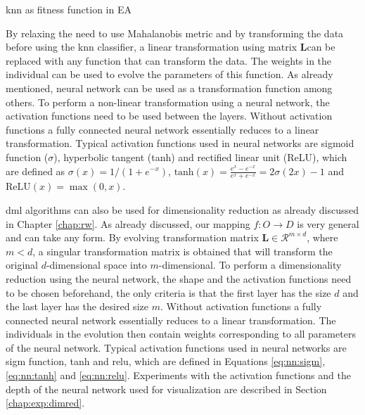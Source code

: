 \documentclass[12pt,a4paper]{report}
\begin{document}
\begin{algorithm}[t]
\caption{\ac{knn} as fitness function in EA} \label{pseudo:ea:knn}
\DontPrintSemicolon
\LinesNumbered
{}
\end{algorithm} 

By relaxing the need to use Mahalanobis metric and by transforming the data before using the \ac{knn} classifier, a linear transformation using matrix $\bm{L}$can be replaced with any function that can transform the data. The weights in the individual can be used to evolve the parameters of this function. As already mentioned, neural network can be used as a transformation function among others. To perform a non-linear transformation using a neural network, the activation functions need to be used between the layers. Without activation functions a fully connected neural network essentially reduces to a linear transformation. Typical activation functions used in neural networks are sigmoid function ($\sigma$), hyperbolic tangent (tanh) and rectified linear unit (ReLU), which are defined as $\sigma(x) = 1/(1+e^{-x})$, $\text{tanh}(x) = \frac{e^x-e^{-x}}{e^x+e^{-x}} = 2\sigma(2x)-1$ and $\text{ReLU}(x) = \max(0,x)$.

\Acl{dml} algorithms can also be used for dimensionality reduction as already discussed in Chapter \ref{chap:rw}. As already discussed, our mapping $f: O \to D$ is very general and can take any form. By evolving transformation matrix $\bm{L} \in \mathcal{R}^{m\times d}$, where $m < d$, a singular transformation matrix is obtained that will transform the original $d$-dimensional space into $m$-dimensional. To perform a dimensionality reduction using the neural network, the shape and the activation functions need to be chosen beforehand, the only criteria is that the first layer has the size $d$ and the last layer has the desired size $m$. Without activation functions a fully connected neural network essentially reduces to a linear transformation. The individuals in the evolution then contain weights corresponding to all parameters of the neural network. Typical activation functions used in neural networks are \acf{sigm} function, \acf{tanh} and \acf{relu}, which are defined in Equations \ref{eq:nn:sigm}, \ref{eq:nn:tanh} and \ref{eq:nn:relu}. Experiments with the activation functions and the depth of the neural network used for visualization are described in Section \ref{chap:exp:dimred}.
\end{document}
